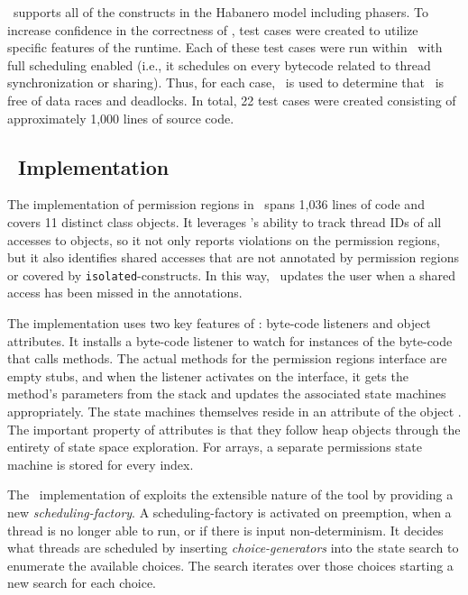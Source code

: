 \hjv\ supports all of the constructs in the Habanero model including
phasers. To increase confidence in the correctness of \hjv, test cases were created
to utilize specific features of the runtime. Each of these test
cases were run within \jpf\ with full scheduling enabled (i.e., it
schedules on every bytecode related to thread synchronization or
sharing). Thus, for each case, \jpf\ is used to determine that \hjv\ is
free of data races and deadlocks. In total, 22 test cases were created
consisting of approximately 1,000 lines of source code.

\subsection{\jpf\ Implementation}

The implementation of permission regions in \jpf\ spans 1,036
lines of code and covers 11 distinct class objects. It leverages
\jpf's ability to track thread IDs of all accesses to objects, so it not only reports
violations on the permission regions, but it also identifies shared
accesses that are not annotated by permission regions or covered by \texttt{isolated}-constructs. In this way,
\jpf\ updates the user when a shared access has been missed in the
annotations.

The implementation uses two key features of \jpf: byte-code listeners
and object attributes. It installs a byte-code listener to watch for
instances of the byte-code that calls methods. The actual methods for
the permission regions interface are empty stubs, and when the
listener activates on the interface, it gets the method's parameters
from the stack and updates the associated state machines
appropriately. The state machines themselves reside in an attribute of the object \cite{DBLP:journals/ase/PasareanuVBGMR13}. The important property of attributes
is that they follow heap objects through the entirety of state space
exploration. For arrays, a separate permissions state machine is stored
for every index. 

The \jpf\ implementation of  exploits the
extensible nature of the tool by providing a new
\emph{scheduling-factory}.  A scheduling-factory is activated on
preemption, when a thread is no longer able to run, or if there is
input non-determinism.  It decides what
threads are scheduled by inserting
\emph{choice-generators} into the state search to enumerate the available choices. The search iterates over those
choices starting a new search for each choice.


